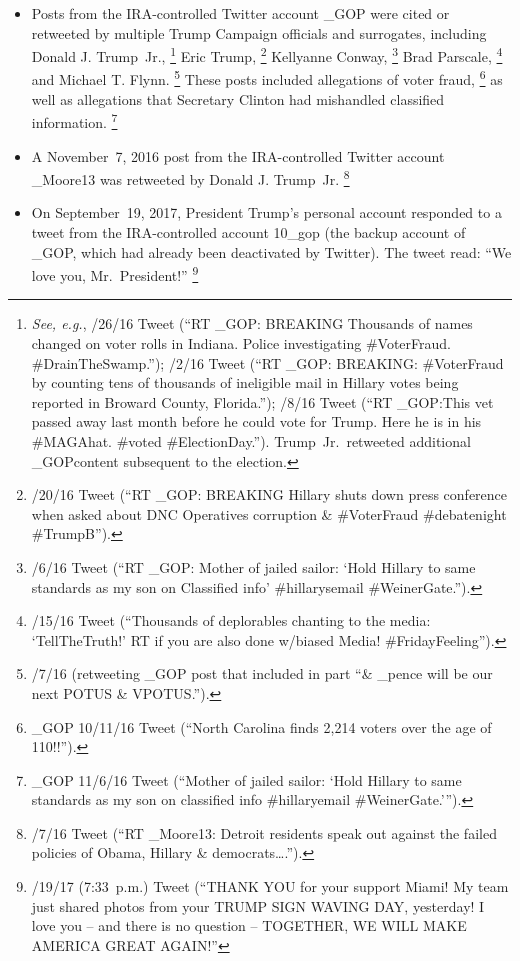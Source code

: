 \begin{itemize}
    \item Posts from the IRA-controlled Twitter account \@TEN\_GOP were cited or retweeted by multiple Trump Campaign officials and surrogates, including Donald J. Trump~Jr.,%
	    \footnote{\textit{See, e.g.}, /26/16 Tweet (``RT \@TEN\_GOP: BREAKING Thousands of names changed on voter rolls in Indiana.
    Police investigating \#VoterFraud. \#DrainTheSwamp.'');
    /2/16 Tweet (``RT \@TEN\_GOP: BREAKING: \#VoterFraud by counting tens of thousands of ineligible mail in Hillary votes being reported in Broward County, Florida.'');
    /8/16 Tweet (``RT \@TEN\_GOP:This vet passed away last month before he could vote for Trump.
    Here he is in his \#MAGAhat.
    \#voted \#ElectionDay.''). Trump~Jr.\ retweeted additional \@TEN\_GOPcontent subsequent to the election.}
    Eric Trump,%
    \footnote{/20/16 Tweet (``RT \@TEN\_GOP: BREAKING Hillary shuts down press conference when asked about DNC Operatives corruption \& \#VoterFraud \#debatenight \#TrumpB'').}
    Kellyanne Conway,%
    \footnote{/6/16 Tweet (``RT \@TEN\_GOP: Mother of jailed sailor: `Hold Hillary to same standards as my son on Classified info' \#hillarysemail \#WeinerGate.'').}
    Brad Parscale,%
    \footnote{/15/16 Tweet (``Thousands of deplorables chanting to the media: `TellTheTruth!' RT if you are also done w/biased Media! \#FridayFeeling'').}
    and Michael T. Flynn.%
    \footnote{/7/16 (retweeting \@TEN\_GOP post that included in part ``\@realDonaldTrump \& \@mike\_pence will be our next POTUS \& VPOTUS.'').}
    These posts included allegations of voter fraud,%
    \footnote{\@TEN\_GOP 10/11/16 Tweet (``North Carolina finds 2,214 voters over the age of 110!!'').}
    as well as allegations that Secretary Clinton had mishandled classified information.%
		\footnote{\@TEN\_GOP 11/6/16 Tweet (``Mother of jailed sailor: `Hold Hillary to same standards as my son on classified info \#hillaryemail \#WeinerGate.'\thinspace'').}
    \item A November~7, 2016 post from the IRA-controlled Twitter account \@Pamela\_Moore13 was retweeted by Donald J. Trump~Jr.%
    \footnote{/7/16 Tweet (``RT \@Pamela\_Moore13: Detroit residents speak out against the failed policies of Obama, Hillary \& democrats\dots.'').}
    \item On September~19, 2017, President Trump's personal account \@realDonaldTrump responded to a tweet from the IRA-controlled account \@10\_gop (the backup account of \@TEN\_GOP, which had already been deactivated by Twitter). The tweet read: ``We love you, Mr.~President!''%
    \footnote{/19/17 (7:33~p.m.) Tweet (``THANK YOU for your support Miami! My team just shared photos from your TRUMP SIGN WAVING DAY, yesterday! I love you -- and there is no question -- TOGETHER, WE WILL MAKE AMERICA GREAT AGAIN!''}
\end{itemize}

